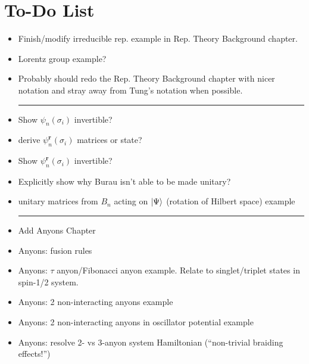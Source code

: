 \chapter{To-Do List}\label{ch:todo}

\begin{itemize}
    \item Finish/modify irreducible rep. example in Rep. Theory Background chapter.
    \item Lorentz group example?
    \item Probably should redo the Rep. Theory Background chapter with nicer notation and stray away from Tung's notation when possible.
    
    \begin{center}\rule{.85\textwidth}{0.65pt}\end{center}
    
    \item Show $\psi_n(\sigma_i)$ invertible?
    \item derive $\psi_n^\textbf{r}(\sigma_i)$ matrices or state?
    \item Show $\psi_n^\textbf{r}(\sigma_i)$ invertible?
    \item Explicitly show why Burau isn't able to be made unitary?
    \item unitary matrices from $B_n$ acting on $\ket{\Psi}$ (rotation of Hilbert space) example
    
    \begin{center}\rule{.85\textwidth}{0.65pt}\end{center}
    
    \item Add Anyons Chapter
    \item Anyons: fusion rules
    \item Anyons: $\tau$ anyon/Fibonacci anyon example. Relate to singlet/triplet states in spin-1/2 system.
    \item Anyons: 2 non-interacting anyons example
    \item Anyons: 2 non-interacting anyons in oscillator potential example
    \item Anyons: resolve 2- vs 3-anyon system Hamiltonian (``non-trivial braiding effects!'')
\end{itemize}
